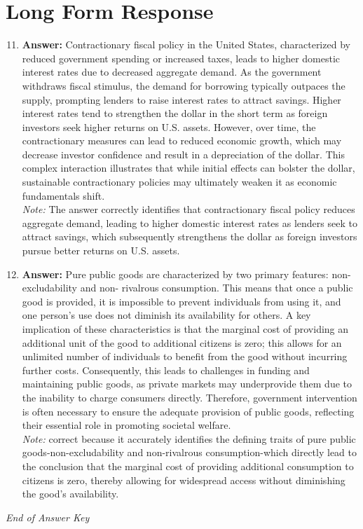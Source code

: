 \documentclass[12pt]{article}
\begin{document}
\section*{Long Form Response}
\begin{enumerate}[label=\arabic*.]
\setcounter{enumi}{10}
\item \textbf{Answer:} Contractionary fiscal policy in the United States, characterized by reduced government spending or increased taxes, leads to higher domestic interest rates due to decreased aggregate demand. As the government withdraws fiscal stimulus, the demand for borrowing typically outpaces the supply, prompting lenders to raise interest rates to attract savings. Higher interest rates tend to strengthen the dollar in the short term as foreign investors seek higher returns on U.S. assets. However, over time, the contractionary measures can lead to reduced economic growth, which may decrease investor confidence and result in a depreciation of the dollar. This complex interaction illustrates that while initial effects can bolster the dollar, sustainable contractionary policies may ultimately weaken it as economic fundamentals shift.
\\ \textit{Note:} The answer correctly identifies that contractionary fiscal policy reduces aggregate demand, leading to higher domestic interest rates as lenders seek to attract savings, which subsequently strengthens the dollar as foreign investors pursue better returns on U.S. assets.
\item \textbf{Answer:} Pure public goods are characterized by two primary features: non-excludability and non- rivalrous consumption. This means that once a public good is provided, it is impossible to prevent individuals from using it, and one person's use does not diminish its availability for others. A key implication of these characteristics is that the marginal cost of providing an additional unit of the good to additional citizens is zero; this allows for an unlimited number of individuals to benefit from the good without incurring further costs. Consequently, this leads to challenges in funding and maintaining public goods, as private markets may underprovide them due to the inability to charge consumers directly. Therefore, government intervention is often necessary to ensure the adequate provision of public goods, reflecting their essential role in promoting societal welfare.
\\ \textit{Note:} correct because it accurately identifies the defining traits of pure public goods-non-excludability and non-rivalrous consumption-which directly lead to the conclusion that the marginal cost of providing additional consumption to citizens is zero, thereby allowing for widespread access without diminishing the good's availability.
\end{enumerate}

\vfill
\noindent\textit{End of Answer Key}
\end{document}
